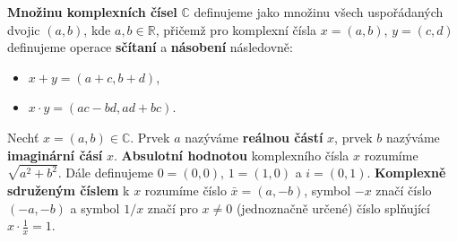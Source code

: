\begin{definice}
\textbf{Množinu komplexních čísel} $\mathbb C $ definujeme jako množinu
všech uspořádaných dvojic $(a,b)$, kde $a,b \in \mathbb R $, přičemž pro komplexní čísla
$x=(a,b)$, $y=(c,d)$ definujeme operace \textbf{sčítaní} a \textbf{násobení} následovně:
\begin{itemize}
	\item $x+y=(a+c,b+d)$,
	\item $x\cdot y = (ac-bd, ad+bc)$.
\end{itemize}
\par Nechť $x=(a,b)\in \mathbb C $. Prvek $a$ nazýváme \textbf{reálnou částí} $x$,
prvek $b$ nazýváme \textbf{imaginární čásí} $x$. \textbf{Absulotní hodnotou} komplexního čísla $x$
rozumíme $\sqrt{a^2+b^2}$. Dále definujeme $0=(0,0)$, $1=(1,0)$ a $i=(0,1)$.
\textbf{Komplexně sdruženým číslem} k $x$ rozumíme číslo $\bar{x} =(a,-b)$, symbol $-x$
značí číslo $(-a,-b)$ a symbol $1/x$ značí pro $x\ne 0$ (jednoznačně určené)
číslo splňující $x\cdot \frac{1}{x}=1$.
\end{definice}
